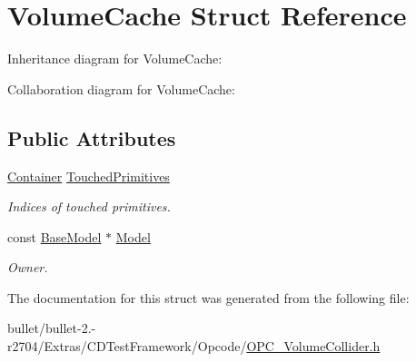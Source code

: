 \hypertarget{struct_volume_cache}{\section{Volume\+Cache Struct Reference}
\label{struct_volume_cache}
}


Inheritance diagram for Volume\+Cache\+:


Collaboration diagram for Volume\+Cache\+:
\subsection*{Public Attributes}
\begin{DoxyCompactItemize}
\item 
\hypertarget{struct_volume_cache_a0f1a8f7336e3f0c1425053c21d98cdcd}{\hyperlink{class_container}{Container} \hyperlink{struct_volume_cache_a0f1a8f7336e3f0c1425053c21d98cdcd}{Touched\+Primitives}}\label{struct_volume_cache_a0f1a8f7336e3f0c1425053c21d98cdcd}

\begin{DoxyCompactList}\small\item\em Indices of touched primitives. \end{DoxyCompactList}\item 
\hypertarget{struct_volume_cache_a62019b1a5c5bd816c0d799fea84e1607}{const \hyperlink{class_base_model}{Base\+Model} $\ast$ \hyperlink{struct_volume_cache_a62019b1a5c5bd816c0d799fea84e1607}{Model}}\label{struct_volume_cache_a62019b1a5c5bd816c0d799fea84e1607}

\begin{DoxyCompactList}\small\item\em Owner. \end{DoxyCompactList}\end{DoxyCompactItemize}


The documentation for this struct was generated from the following file\+:\begin{DoxyCompactItemize}
\item 
bullet/bullet-\/2.-\/r2704/\+Extras/\+C\+D\+Test\+Framework/\+Opcode/\hyperlink{_o_p_c___volume_collider_8h}{O\+P\+C\+\_\+\+Volume\+Collider.\+h}\end{DoxyCompactItemize}
